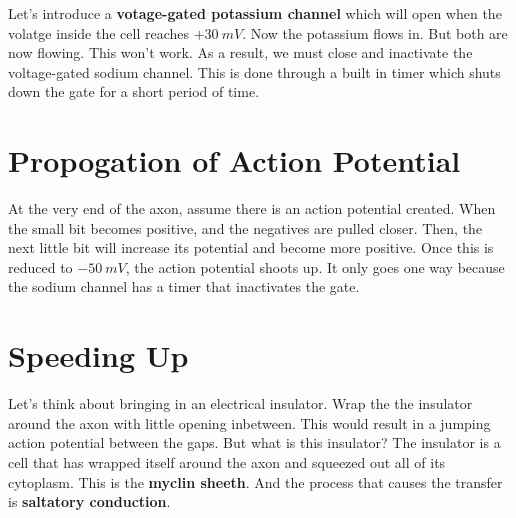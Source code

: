 \documentclass{article}
\begin{document}
Let's introduce a \textbf{votage-gated potassium channel} which will open when
the volatge inside the cell reaches $+30\ \si{ mV }$. Now the potassium flows
in. But both are now flowing. This won't work. As a result, we must close and
inactivate the voltage-gated sodium channel. This is done through a built in
timer which shuts down the gate for a short period of time.

\section{ Propogation of Action Potential }

At the very end of the axon, assume there is an action potential created. When
the small bit becomes positive, and the negatives are pulled closer. Then, the
next little bit will increase its potential and become more positive. Once this
is reduced to $-50\ \si{ mV }$, the action potential shoots up. It only goes one
way because the sodium channel has a timer that inactivates the gate.

\section{ Speeding Up }

Let's think about bringing in an electrical insulator. Wrap the the insulator
around the axon with little opening inbetween. This would result in a jumping
action potential between the gaps. But what is this insulator? The insulator is
a cell that has wrapped itself around the axon and squeezed out all of its
cytoplasm. This is the \textbf{myclin sheeth}. And the process that causes the
transfer is \textbf{saltatory conduction}.
\end{document}
